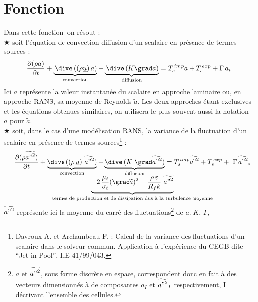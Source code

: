 \section*{Fonction}
Dans cette fonction, on r\'{e}sout : \\
{\tiny$\bigstar$} soit l'\'{e}quation de convection-diffusion d'un scalaire en
pr\'{e}sence de termes sources :
\begin{equation}
\frac {\partial  (\rho a)}{\partial t} +
\underbrace{\,\dive\,((\rho \underline{u})\,a)}_{\text{convection}}
- \underbrace{\,\dive\,(K \grad a)}_{\text{diffusion}} = T_s^{\,imp} a
+T_s^{\,exp} +\Gamma\,a_i
\end{equation}
Ici $a$ repr\'{e}sente la valeur instantan\'{e}e du scalaire en approche laminaire ou,
en approche RANS, sa moyenne de Reynolds $\widetilde{a}$. Les deux approches
\'{e}tant exclusives et les \'{e}quations obtenues similaires, on utilisera le plus
souvent aussi la notation $a$ pour $\widetilde{a}$.\\
{\tiny$\bigstar$} soit, dans le cas d'une mod\'{e}lisation RANS, la variance de la
fluctuation d'un scalaire en pr\'{e}sence de termes sources\footnote{Davroux A. et
Archambeau F. : Calcul de la variance des fluctuations
d'un scalaire dans le solveur commun. Application \`{a} l'exp\'{e}rience du CEGB dite
``Jet in Pool'', HE-41/99/043.} :
\begin{equation}
\begin{array}{lcl}
&\displaystyle
 \frac {\partial  (\rho \widetilde{{a"}^2})}{\partial t} +
\underbrace{\dive\,((\rho\,\underline{u})\ \widetilde{{a"}^2})}_{\text{convection}}
- \underbrace{\dive\,(K\ \grad \widetilde{{a"}^2})}_{\text{diffusion}} = T_s^{\,imp} \widetilde{{a"}^2}
+T_s^{\,exp} +\ \Gamma\,\widetilde{{a"}^2}_i \\
&\displaystyle \underbrace {+ 2\,\frac{\mu_t}{\sigma_t}(\grad \widetilde{a})^2 -
\frac{\rho\,\varepsilon}{R_f k}\ \widetilde{{a"}^2}}_{\text{termes de production et
de dissipation dus \`{a} la turbulence moyenne}}
\end{array}
\end{equation}
$\widetilde{{a"}^2}$ repr\'esente ici la moyenne du carr\'e des fluctuations\footnote{$a$ et
$\widetilde{{a"}^2}$, sous forme discr\`ete en espace, correspondent donc en
fait \`a des vecteurs dimensionn\'es \`a  de composantes $a_I$ et $\widetilde{{a"}^2}_{I}$
respectivement, I d\'ecrivant l'ensemble des cellules.} de $a$. $K$, $\Gamma$,

